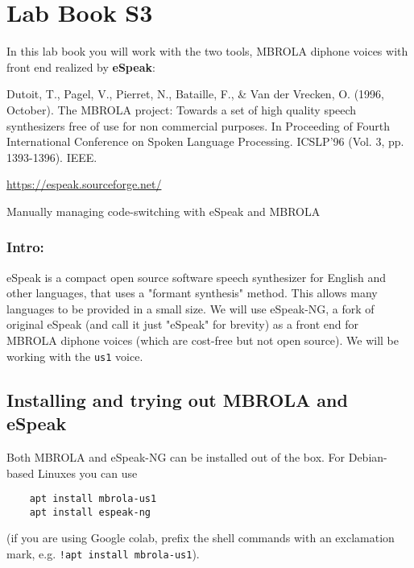 \documentclass{../labbook}
\begin{document}
\section{Lab Book S3}
\noindent In this lab book you will work with the two tools, {MBROLA} diphone voices with front end realized by \textbf{eSpeak}:

\noindent Dutoit, T., Pagel, V., Pierret, N., Bataille, F., \& Van der Vrecken, O. (1996, October). The MBROLA project: Towards a set of high quality speech synthesizers free of use for non commercial purposes. In Proceeding of Fourth International Conference on Spoken Language Processing. ICSLP'96 (Vol. 3, pp. 1393-1396). IEEE.

\noindent \href{https://espeak.sourceforge.net/}{https://espeak.sourceforge.net/}


\begin{problem}{2}{7}{Manually managing code-switching with eSpeak and MBROLA}
\subsubsection*{Intro:}
eSpeak is a compact open source software speech synthesizer for English and other languages, that uses a "formant synthesis" method. This allows many languages to be provided in a small size. 
We will use eSpeak-NG, a fork of original eSpeak (and call it just "eSpeak" for brevity) as a front end for MBROLA diphone voices (which are cost-free but not open source). We will be working with the \texttt{us1} voice.

\subsection*{Installing and trying out MBROLA and eSpeak}
Both MBROLA and eSpeak-NG can be installed out of the box. For Debian-based Linuxes you can use 
\begin{verbatim} 
    apt install mbrola-us1
    apt install espeak-ng
\end{verbatim} (if you are using Google colab, prefix the shell commands with an exclamation mark, e.g. 
\texttt{!apt install mbrola-us1}).
\smallskip


\end{problem}
\end{document}
